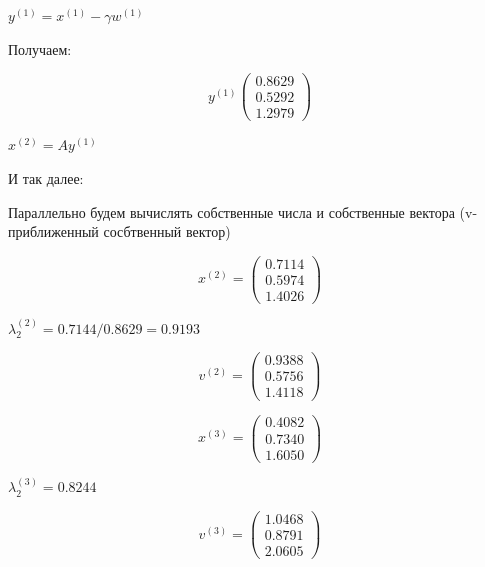 \begin{math}
	y^{(1)}= x^{(1)}-\gamma w^{(1)}
\end{math}

Получаем: 

\begin{equation}
	y^{(1)}
	\begin{pmatrix}
		0.8629 \\
		0.5292 \\
		1.2979
	\end{pmatrix}
\end{equation}


\begin{math}
	x^{(2)}=Ay^{(1)}
\end{math}


И так далее: 

Параллельно будем вычислять собственные числа и собственные вектора (v-приближенный сосбтвенный вектор)

\begin{equation}
	x^{(2)}=
	\begin{pmatrix}
		0.7114 \\
		0.5974 \\
		1.4026
	\end{pmatrix}
\end{equation}

\begin{math}
	\lambda_{2}^{(2)}=0.7144/0.8629=0.9193
\end{math}

\begin{equation}
	v^{(2)}=
	\begin{pmatrix}
		0.9388 \\
		0.5756 \\
		1.4118
	\end{pmatrix}
\end{equation}

\begin{equation}
	x^{(3)}=
	\begin{pmatrix}
		0.4082 \\
		0.7340 \\
		1.6050
	\end{pmatrix}
\end{equation}

\begin{math}
	\lambda_{2}^{(3)}=0.8244
\end{math}

\begin{equation}
	v^{(3)}=
	\begin{pmatrix}
		1.0468 \\
		0.8791 \\
		2.0605
	\end{pmatrix}
\end{equation}

